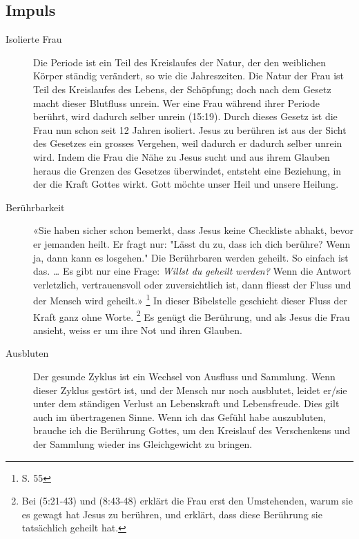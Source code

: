 \subsection{Impuls}
\begin{impuls}
\begin{description}
\item[Isolierte Frau] Die Periode ist ein Teil des Kreislaufes der Natur, der den weiblichen Körper ständig verändert, so wie die Jahreszeiten. Die Natur der Frau ist Teil des Kreislaufes des Lebens, der Schöpfung; doch nach dem Gesetz macht dieser Blutfluss unrein. Wer eine Frau während ihrer Periode berührt, wird dadurch selber unrein (15:19). Durch dieses Gesetz ist die Frau nun schon seit 12 Jahren isoliert. Jesus zu berühren ist aus der Sicht des Gesetzes ein grosses Vergehen, weil dadurch er dadurch selber unrein wird. Indem die Frau die Nähe zu Jesus sucht und aus ihrem Glauben heraus die Grenzen des Gesetzes überwindet, entsteht eine Beziehung, in der die Kraft Gottes wirkt. Gott möchte unser Heil und unsere Heilung.

\item[Berührbarkeit] «Sie haben sicher schon bemerkt, dass Jesus keine Checkliste abhakt, bevor er jemanden heilt. Er fragt nur: "Lässt du zu, dass ich dich berühre? Wenn ja, dann kann es losgehen." Die Berührbaren werden geheilt. So einfach ist das. … Es gibt nur eine Frage: \textit{Willst du geheilt werden?} Wenn die Antwort verletzlich, vertrauensvoll oder zuversichtlich ist, dann fliesst der Fluss und der Mensch wird geheilt.» \footnote{\cite{Tanz} S. 55}
In dieser Bibelstelle geschieht dieser Fluss der Kraft ganz ohne Worte. 
\footnote{Bei (5:21-43) und (8:43-48) erklärt die Frau erst den Umstehenden, warum sie es gewagt hat Jesus zu berühren, und erklärt, dass diese Berührung sie tatsächlich geheilt hat.}
Es genügt die Berührung, und als Jesus die Frau ansieht, weiss er um ihre Not und ihren Glauben.

\item[Ausbluten] Der gesunde Zyklus ist ein Wechsel von Ausfluss und Sammlung. Wenn dieser Zyklus gestört ist, und der Mensch nur noch ausblutet, leidet er/sie unter dem ständigen Verlust an Lebenskraft und Lebensfreude. Dies gilt auch im übertragenen Sinne. Wenn ich das Gefühl habe auszubluten, brauche ich die Berührung Gottes, um den Kreislauf des Verschenkens und der Sammlung wieder ins Gleichgewicht zu bringen.
\end{description}

   

\end{impuls}
